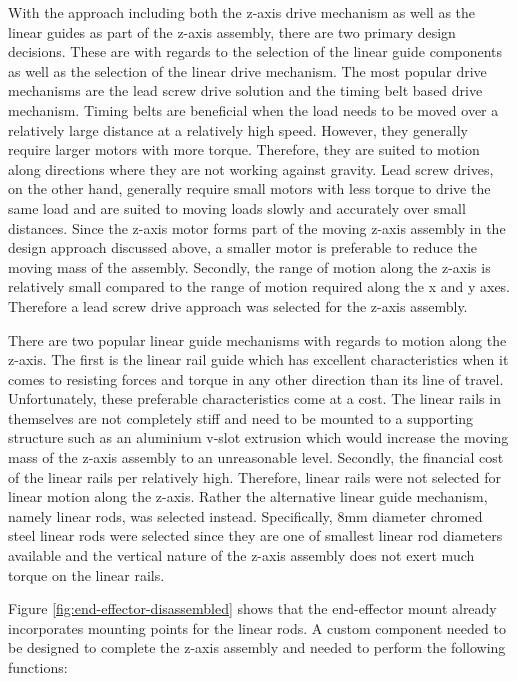 With the approach including both the z-axis drive mechanism as well as the linear guides as part of the z-axis assembly, there are two primary design decisions. These are with regards to the selection of the linear guide components as well as the selection of the linear drive mechanism. The most popular drive mechanisms are the lead screw drive solution and the timing belt based drive mechanism. Timing belts are beneficial when the load needs to be moved over a relatively large distance at a relatively high speed. However, they generally require larger motors with more torque. Therefore, they are suited to motion along directions where they are not working against gravity. Lead screw drives, on the other hand, generally require small motors with less torque to drive the same load and are suited to moving loads slowly and accurately over small distances. Since the z-axis motor forms part of the moving z-axis assembly in the design approach discussed above, a smaller motor is preferable to reduce the moving mass of the assembly. Secondly, the range of motion along the z-axis is relatively small compared to the range of motion required along the x and y axes. Therefore a lead screw drive approach was selected for the z-axis assembly.

There are two popular linear guide mechanisms with regards to motion along the z-axis. The first is the linear rail guide which has excellent characteristics when it comes to resisting forces and torque in any other direction than its line of travel. Unfortunately, these preferable characteristics come at a cost. The linear rails in themselves are not completely stiff and need to be mounted to a supporting structure such as an aluminium v-slot extrusion which would increase the moving mass of the z-axis assembly to an unreasonable level. Secondly, the financial cost of the linear rails per relatively high. Therefore, linear rails were not selected for linear motion along the z-axis. Rather the alternative linear guide mechanism, namely linear rods, was selected instead. Specifically, 8mm diameter chromed steel linear rods were selected since they are one of smallest linear rod diameters available and the vertical nature of the z-axis assembly does not exert much torque on the linear rails.

Figure \ref{fig:end-effector-disassembled} shows that the end-effector mount already incorporates mounting points for the linear rods. A custom component needed to be designed to complete the z-axis assembly and needed to perform the following functions:

